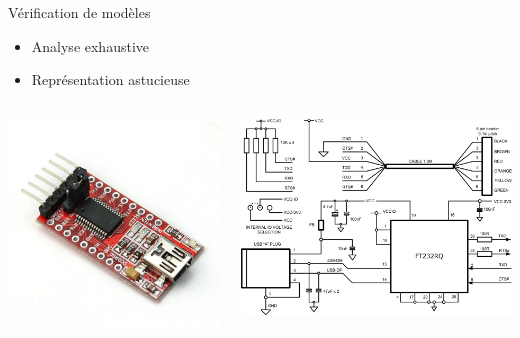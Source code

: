 \begin{frame}{Vérification de modèles}
  \begin{block}{}
    \begin{itemize}
    \item Analyse exhaustive
    \item Représentation astucieuse
    \end{itemize}
  \end{block}
  \begin{columns}
    \begin{column}{0.5\textwidth}
      \includegraphics[width=\textwidth]{media/ftdi.jpg}
    \end{column}
    \begin{column}{0.5\textwidth}
      \includegraphics[width=\textwidth]{media/sftdi.jpg}
    \end{column}
  \end{columns}
\end{frame}

